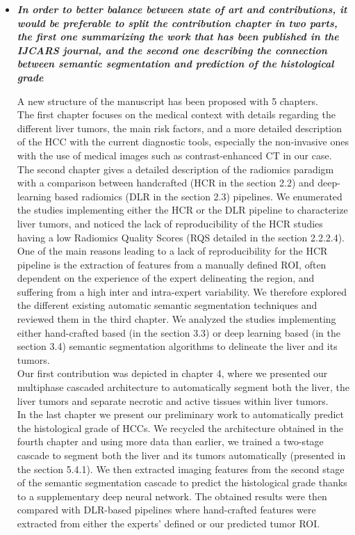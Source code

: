 \documentclass{article}
\begin{document}
\begin{itemize}

\item \textit{\textbf{In order to better balance between state of art and contributions, it would be preferable to split the contribution chapter in two parts, the first one summarizing the work that has been published in the IJCARS journal, and the second one describing the connection between semantic segmentation and prediction of the histological grade}}

A new structure of the manuscript has been proposed with 5 chapters.\\
The first chapter focuses on the medical context with details regarding the different liver tumors, the main risk factors, and a more detailed description of the HCC with the current diagnostic tools, especially the non-invasive ones with the use of medical images such as contrast-enhanced CT in our case. \\
The second chapter gives a detailed description of the radiomics paradigm with a comparison between handcrafted (HCR in the section 2.2) and deep-learning based radiomics (DLR in the section 2.3) pipelines. We enumerated the studies implementing either the HCR or the DLR pipeline to characterize liver tumors, and noticed the lack of reproducibility of the HCR studies having a low Radiomics Quality Scores (RQS detailed in the section 2.2.2.4). One of the main reasons leading to a lack of reproducibility for the HCR pipeline is the extraction of features from a manually defined ROI, often dependent on the experience of the expert delineating the region, and suffering from a high inter and intra-expert variability.
We therefore explored the different existing automatic semantic segmentation techniques and reviewed them in the third chapter. We analyzed the studies implementing either hand-crafted based (in the section 3.3) or deep learning based (in the section 3.4) semantic segmentation algorithms to delineate the liver and its tumors.\\
Our first contribution was depicted in chapter 4, where we presented our multiphase cascaded architecture to automatically segment both the liver, the liver tumors and separate necrotic and active tissues within liver tumors. \\
In the last chapter we present our preliminary work to automatically predict the histological grade of HCCs. We recycled the architecture obtained in the fourth chapter and using more data than earlier, we trained a two-stage cascade to segment both the liver and its tumors automatically (presented in the section 5.4.1). We then extracted imaging features from the second stage of the semantic segmentation cascade to predict the histological grade thanks to a supplementary deep neural network. The obtained results were then compared with DLR-based pipelines where hand-crafted features were extracted from either the experts' defined or our predicted tumor ROI.



\end{itemize}
\end{document}
